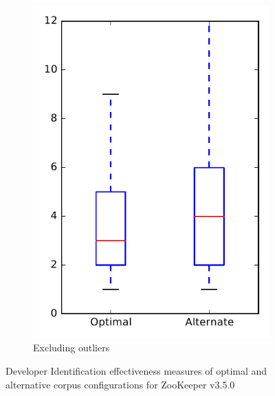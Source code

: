 \begin{figure}
\begin{subfigure}{.4\textwidth}
        \includegraphics[height=0.4\textheight]{figures/combo/dit_rq2_zookeeper_no_outlier}
        \caption{Excluding outliers}\label{fig:combo:dit:rq2:zookeeper_no_outlier}
    \end{subfigure}
\caption{Developer Identification effectiveness measures of optimal and alternative corpus configurations for ZooKeeper v3.5.0}
\label{fig:combo:dit:rq2:zookeeper}
\end{figure}
